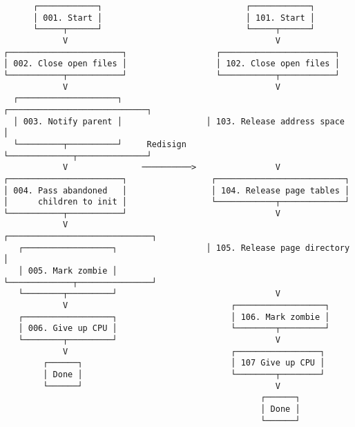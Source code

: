 \documentclass[varwidth=80em,crop]{standalone}
\begin{document}
\begin{verbatim}
      ┌────────────┐                             ┌────────────┐
      │ 001. Start │                             │ 101. Start │
      └─────┬──────┘                             └─────┬──────┘
            V                                          V
┌───────────────────────┐                  ┌───────────────────────┐
│ 002. Close open files │                  │ 102. Close open files │
└───────────┬───────────┘                  └───────────┬───────────┘
            V                                          V
  ┌────────────────────┐                 ┌────────────────────────────┐
  │ 003. Notify parent │                 │ 103. Release address space │
  └─────────┬──────────┘     Redisign    └─────────────┬──────────────┘
            V               ──────────>                V
┌───────────────────────┐                 ┌──────────────────────────┐
│ 004. Pass abandoned   │                 │ 104. Release page tables │
│      children to init │                 └────────────┬─────────────┘     
└───────────┬───────────┘                              V
            V                            ┌─────────────────────────────┐   
   ┌──────────────────┐                  │ 105. Release page directory │
   │ 005. Mark zombie │                  └─────────────┬───────────────┘   
   └────────┬─────────┘                                V
            V                                 ┌──────────────────┐         
   ┌──────────────────┐                       │ 106. Mark zombie │         
   │ 006. Give up CPU │                       └────────┬─────────┘         
   └────────┬─────────┘                                V                   
            V                                 ┌─────────────────┐          
        ┌──────┐                              │ 107 Give up CPU │
        │ Done │                              └────────┬────────┘          
        └──────┘                                       V                   
                                                    ┌──────┐                
                                                    │ Done │ 
                                                    └──────┘                
\end{verbatim}
\end{document}
